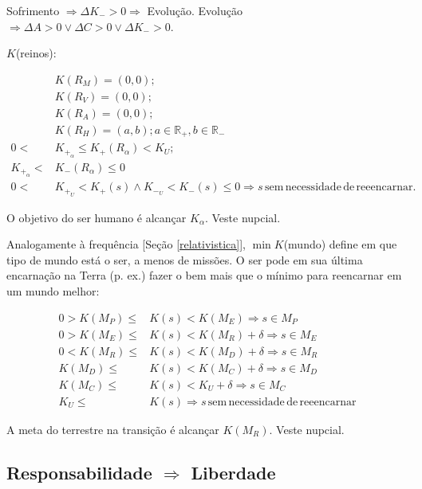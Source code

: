 \documentclass[12pt,a4paper]{article}
\begin{document}
			Sofrimento $\Rightarrow \Delta K_- > 0 \Rightarrow $ Evolu\c{c}\~ao. Evolu\c{c}\~ao $\Rightarrow \Delta A > 0 \vee \Delta C > 0 \vee \Delta K_- > 0$.

			$K$(reinos):

			\begin{align*}
				&K(R_M) = (0,0); \\
				&K(R_V) = (0,0); \\
				&K(R_A) = (0,0); \\
				&K(R_H) = (a,b); a \in \mathbb{R}_+, b \in \mathbb{R}_- \\
				0 < &K_{+_\alpha} \le K_+(R_\alpha) < K_U; \\
				K_{+_\alpha} < &K_-(R_\alpha) \le 0 \\
				0 < &K_{+_U} < K_+(s) \wedge K_{-_U} < K_-(s) \le 0 \Rightarrow s \mathrm{\,sem\,necessidade\,de\,reeencarnar.}
			\end{align*}

			O objetivo do ser humano \'e alcan\c{c}ar $K_\alpha$. Veste nupcial\cite{batista}.

			Analogamente \`a frequ\^encia [Se\c{c}\~ao \ref{relativistica}], $\min K$(mundo) define em que tipo de mundo est\'a o ser, a menos de miss\~oes. O ser pode em sua \'ultima encarna\c{c}\~ao na Terra (p. ex.) fazer o bem mais que o m\'inimo para reencarnar em um mundo melhor:

			\begin{align*}
				0 > K(M_P) \le &K(s) < K(M_E) \Rightarrow s \in M_P \\
				0 > K(M_E) \le &K(s) < K(M_R) + \delta \Rightarrow s \in M_E \\
				0 < K(M_R) \le &K(s) < K(M_D) + \delta \Rightarrow s \in M_R \\
				K(M_D) \le &K(s) < K(M_C) + \delta \Rightarrow s \in M_D \\
				K(M_C) \le &K(s) < K_U + \delta \Rightarrow s \in M_C \\
				K_U \le &K(s) \Rightarrow s \mathrm{\,sem\,necessidade\,de\,reeencarnar}
			\end{align*}

			A meta do terrestre na transi\c{c}\~ao \'e alcan\c{c}ar $K(M_R)$. Veste nupcial\cite{batista}.

		\subsection{Responsabilidade $\Rightarrow$ Liberdade}\label{respLib}
			\begin{flushright}
			\end{flushright}
\end{document}
